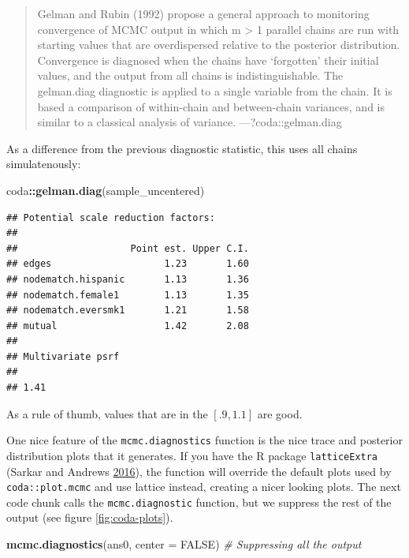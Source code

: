 \documentclass[]{book}
\newenvironment{Shaded}{\begin{snugshade}}{\end{snugshade}}
\newcommand{\KeywordTok}[1]{\textcolor[rgb]{0.13,0.29,0.53}{\textbf{#1}}}
\newcommand{\DataTypeTok}[1]{\textcolor[rgb]{0.13,0.29,0.53}{#1}}
\newcommand{\CommentTok}[1]{\textcolor[rgb]{0.56,0.35,0.01}{\textit{#1}}}
\newcommand{\OtherTok}[1]{\textcolor[rgb]{0.56,0.35,0.01}{#1}}
\newcommand{\OperatorTok}[1]{\textcolor[rgb]{0.81,0.36,0.00}{\textbf{#1}}}
\newcommand{\NormalTok}[1]{#1}
\theoremstyle{definition}
\theoremstyle{definition}
\theoremstyle{definition}
\theoremstyle{remark}
\begin{document}
\begin{enumerate}
  \begin{quote}
  Gelman and Rubin (1992) propose a general approach to monitoring
  convergence of MCMC output in which m \textgreater{} 1 parallel chains
  are run with starting values that are overdispersed relative to the
  posterior distribution. Convergence is diagnosed when the chains have
  `forgotten' their initial values, and the output from all chains is
  indistinguishable. The gelman.diag diagnostic is applied to a single
  variable from the chain. It is based a comparison of within-chain and
  between-chain variances, and is similar to a classical analysis of
  variance. ---?coda::gelman.diag
  \end{quote}

  As a difference from the previous diagnostic statistic, this uses all
  chains simulatenously:

\begin{Shaded}
\begin{Highlighting}[]
\NormalTok{coda}\OperatorTok{::}\KeywordTok{gelman.diag}\NormalTok{(sample_uncentered)}
\end{Highlighting}
\end{Shaded}

\begin{verbatim}
## Potential scale reduction factors:
## 
##                    Point est. Upper C.I.
## edges                    1.23       1.60
## nodematch.hispanic       1.13       1.36
## nodematch.female1        1.13       1.35
## nodematch.eversmk1       1.21       1.58
## mutual                   1.42       2.08
## 
## Multivariate psrf
## 
## 1.41
\end{verbatim}

  As a rule of thumb, values that are in the \([.9,1.1]\) are good.
\end{enumerate}

One nice feature of the \texttt{mcmc.diagnostics} function is the nice
trace and posterior distribution plots that it generates. If you have
the R package \texttt{latticeExtra} (Sarkar and Andrews
\protect\hyperlink{ref-R-latticeExtra}{2016}), the function will
override the default plots used by \texttt{coda::plot.mcmc} and use
lattice instead, creating a nicer looking plots. The next code chunk
calls the \texttt{mcmc.diagnostic} function, but we suppress the rest of
the output (see figure \ref{fig:coda-plots}).

\begin{Shaded}
\begin{Highlighting}[]
\KeywordTok{mcmc.diagnostics}\NormalTok{(ans0, }\DataTypeTok{center =} \OtherTok{FALSE}\NormalTok{) }\CommentTok{# Suppressing all the output}
\end{Highlighting}
\end{Shaded}
\end{document}
